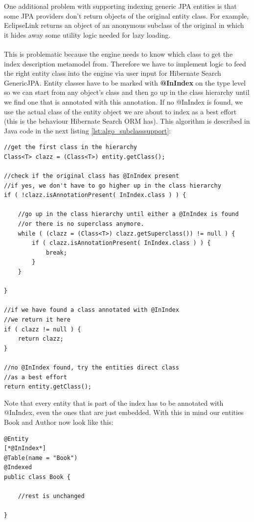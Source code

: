 \pagebreak
\noindent
One additional problem with supporting indexing generic JPA entities is that some JPA providers don't return objects of the original entity class. For example, EclipseLink returns an object of an anonymous subclass of the original in which it hides away some utility logic needed for lazy loading.
\\\\
This is problematic because the engine needs to know which class to get the index description metamodel from. Therefore we have to implement logic to feed the right entity class into the engine via user input for Hibernate Search GenericJPA. Entity classes have to be marked with \textbf{@InIndex} on the type level so we can start from any object's class and then go up in the class hierarchy until we find one that is annotated with this annotation. If no @InIndex is found, we use the actual class of the entity object we are about to index as a best effort (this is the behaviour Hibernate Search ORM has). This algorithm is described in Java code in the next listing \ref{lst:algo_subclasssupport}:
\\
\lstset{language=java}
\begin{lstlisting}[frame=htrbl, caption={Algorithm to determine the actual indexed type}, label={lst:algo_subclasssupport}]
//get the first class in the hierarchy
Class<T> clazz = (Class<T>) entity.getClass();

//check if the original class has @InIndex present
//if yes, we don't have to go higher up in the class hierarchy
if ( !clazz.isAnnotationPresent( InIndex.class ) ) {

	//go up in the class hierarchy until either a @InIndex is found
	//or there is no superclass anymore.
	while ( (clazz = (Class<T>) clazz.getSuperclass()) != null ) {
		if ( clazz.isAnnotationPresent( InIndex.class ) ) {
			break;
		}
	}
	
}

//if we have found a class annotated with @InIndex
//we return it here
if ( clazz != null ) {
	return clazz;
}

//no @InIndex found, try the entities direct class
//as a best effort
return entity.getClass();
\end{lstlisting}

\pagebreak
\noindent
Note that every entity that is part of the index has to be annotated with @InIndex, even the ones that are just embedded. With this in mind our entities Book and Author now look like this:
\\
\lstset{language=java}
\begin{lstlisting}[frame=htrbl, caption={Book.java with @InIndex}, label={lst:book.java_2}]
@Entity
[*@InIndex*]
@Table(name = "Book")
@Indexed
public class Book {
	
	//rest is unchanged

}
\end{lstlisting}

